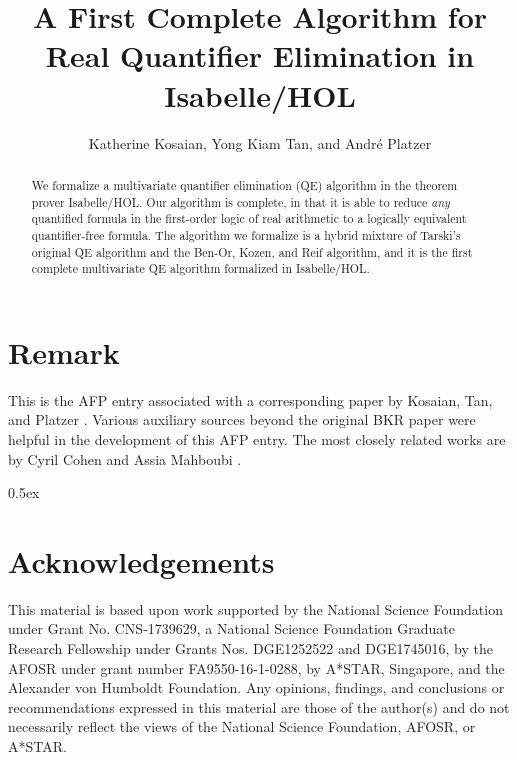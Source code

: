 \documentclass[11pt,a4paper]{article}
\begin{document}
\title{A First Complete Algorithm for Real Quantifier Elimination in Isabelle/HOL}
\author{Katherine Kosaian, Yong Kiam Tan, and Andr\'e Platzer}
\maketitle

\begin{abstract}
We formalize a multivariate quantifier elimination (QE) algorithm in the theorem prover Isabelle/HOL. Our algorithm is complete, in that it is able to reduce \textit{any} quantified formula in the first-order logic of real arithmetic to a logically equivalent quantifier-free formula. The algorithm we formalize is a hybrid mixture of Tarski's original QE algorithm \cite{Tarski} and the Ben-Or, Kozen, and Reif \cite{DBLP:journals/jcss/Ben-OrKR86} algorithm, and it is the first complete multivariate QE algorithm formalized in Isabelle/HOL.
\end{abstract}

\section*{Remark} 
This is the AFP entry associated with a corresponding paper by Kosaian, Tan, and Platzer \cite{DBLP:conf/cpp/KosaianTP23}.
Various auxiliary sources \cite{algRAG,DBLP:journals/jsc/Renegar92b} beyond the original BKR paper were helpful in the development of this AFP entry.
The most closely related works are by Cyril Cohen and Assia Mahboubi \cite{CyrilReduction,cohen_phd,AssiaQE}.

\tableofcontents

\parindent 0pt\parskip 0.5ex



\section*{Acknowledgements}
This material is based upon work supported by the National Science Foundation under Grant No. CNS-1739629, a National Science Foundation Graduate Research Fellowship under Grants Nos. DGE1252522 and DGE1745016, by the AFOSR under grant number FA9550-16-1-0288, by A*STAR, Singapore, and the Alexander von Humboldt Foundation. 
Any opinions, findings, and conclusions or recommendations expressed in this material are those of the author(s) and do not necessarily reflect the views of the National Science Foundation, AFOSR, or A*STAR.





\end{document}
